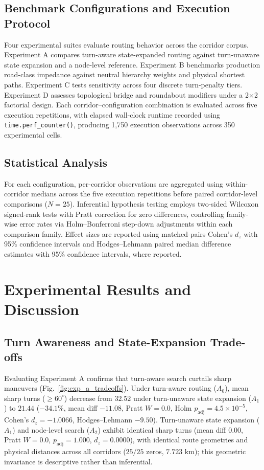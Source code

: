 \documentclass[conference]{IEEEtran}
\begin{document}
\subsection{Benchmark Configurations and Execution Protocol}

Four experimental suites evaluate routing behavior across the corridor corpus. Experiment A compares turn-aware state-expanded routing against turn-unaware state expansion and a node-level reference. Experiment B benchmarks production road-class impedance against neutral hierarchy weights and physical shortest paths. Experiment C tests sensitivity across four discrete turn-penalty tiers. Experiment D assesses topological bridge and roundabout modifiers under a 2×2 factorial design. Each corridor–configuration combination is evaluated across five execution repetitions, with elapsed wall-clock runtime recorded using \texttt{time.perf_counter()}, producing 1,750 execution observations across 350 experimental cells.

\subsection{Statistical Analysis}

For each configuration, per-corridor observations are aggregated using within-corridor medians across the five execution repetitions before paired corridor-level comparisons ($N=25$). Inferential hypothesis testing employs two-sided Wilcoxon signed-rank tests with Pratt correction for zero differences, controlling family-wise error rates via Holm–Bonferroni step-down adjustments within each comparison family. Effect sizes are reported using matched-pairs Cohen's $d_z$ with 95\% confidence intervals and Hodges–Lehmann paired median difference estimates with 95\% confidence intervals, where reported.

\section{Experimental Results and Discussion}

\subsection{Turn Awareness and State-Expansion Trade-offs}

Evaluating Experiment A confirms that turn-aware search curtails sharp maneuvers (Fig.~\ref{fig:exp_a_tradeoffs}). Under turn-aware routing ($A_0$), mean sharp turns ($\ge 60^\circ$) decrease from $32.52$ under turn-unaware state expansion ($A_1$) to $21.44$ ($-34.1\%$, mean diff $-11.08$, Pratt $W = 0.0$, Holm $p_{\text{adj}} = 4.5 \times 10^{-5}$, Cohen's $d_z = -1.0066$, Hodges–Lehmann $-9.50$). Turn-unaware state expansion ($A_1$) and node-level search ($A_2$) exhibit identical sharp turns (mean diff $0.00$, Pratt $W = 0.0$, $p_{\text{adj}} = 1.000$, $d_z = 0.0000$), with identical route geometries and physical distances across all corridors ($25/25$ zeros, $7.723\text{ km}$); this geometric invariance is descriptive rather than inferential.
\end{document}

